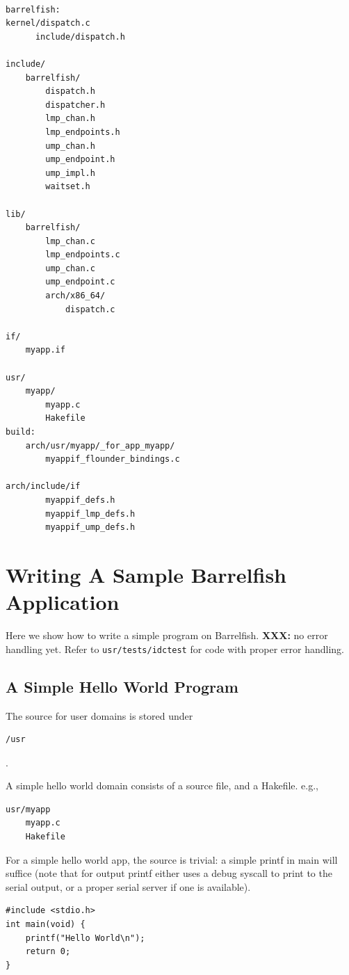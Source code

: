 \documentclass[a4paper,twoside]{report} %
\begin{document}
\begin{verbatim}

barrelfish:
kernel/dispatch.c
      include/dispatch.h

include/
    barrelfish/
        dispatch.h
        dispatcher.h
        lmp_chan.h
        lmp_endpoints.h
        ump_chan.h
        ump_endpoint.h
        ump_impl.h
        waitset.h

lib/
    barrelfish/
        lmp_chan.c
        lmp_endpoints.c
        ump_chan.c
        ump_endpoint.c
        arch/x86_64/
            dispatch.c 

if/
    myapp.if

usr/
    myapp/
        myapp.c
        Hakefile
build:
    arch/usr/myapp/_for_app_myapp/ 
        myappif_flounder_bindings.c

arch/include/if
        myappif_defs.h
        myappif_lmp_defs.h
        myappif_ump_defs.h

\end{verbatim}


\section{Writing A Sample Barrelfish Application}

Here we show how to write a simple program on Barrelfish.  \textbf{XXX:} no
error handling yet.  Refer to \texttt{usr/tests/idctest} for code with proper
error handling.

\subsection{A Simple Hello World Program}

The source for user domains is stored under \begin{verbatim}/usr\end{verbatim}. 

A simple hello world domain consists of a source file, and a Hakefile. e.g.,
\begin{verbatim}
usr/myapp
    myapp.c
    Hakefile
\end{verbatim}

For a simple hello world app, the source is trivial: a simple printf in main
will suffice (note that for output printf either uses a debug syscall to print
to the serial output, or a proper serial server if one is available).

\begin{verbatim}
#include <stdio.h> 
int main(void) {
    printf("Hello World\n");
    return 0;
}
\end{verbatim}
\end{document}
